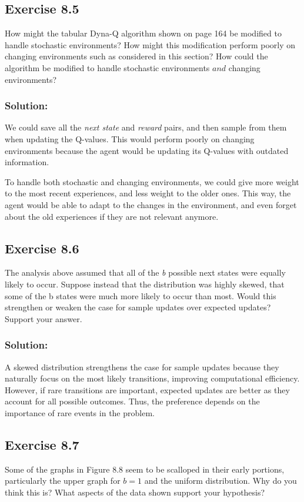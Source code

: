 \subsection*{Exercise 8.5}
How might the tabular Dyna-Q algorithm shown on page 164 be modified
to handle stochastic environments? How might this modification perform poorly on
changing environments such as considered in this section? How could the algorithm be
modified to handle stochastic environments $\textit{and}$ changing environments? 

\subsubsection*{Solution:}

We could save all the \textit{next state} and \textit{reward} pairs, and then sample from them when updating the Q-values. This would perform poorly on changing environments because the agent would be updating its Q-values with outdated information.

To handle both stochastic and changing environments, we could give more weight to the most recent experiences, and less weight to the older ones. This way, the agent would be able to adapt to the changes in the environment, and even forget about the old experiences if they are not relevant anymore.

\subsection*{Exercise 8.6}
The analysis above assumed that all of the \textit{b} possible next states were
equally likely to occur. Suppose instead that the distribution was highly skewed, that
some of the b states were much more likely to occur than most. Would this strengthen or
weaken the case for sample updates over expected updates? Support your answer. 

\subsubsection*{Solution:}
A skewed distribution strengthens the case for sample updates because they naturally focus on the most likely transitions, improving computational efficiency. However, if rare transitions are important, expected updates are better as they account for all possible outcomes. Thus, the preference depends on the importance of rare events in the problem.

\subsection*{Exercise 8.7}
Some of the graphs in Figure 8.8 seem to be scalloped in their early portions,
particularly the upper graph for $b = 1$ and the uniform distribution. Why do you think
this is? What aspects of the data shown support your hypothesis? 

